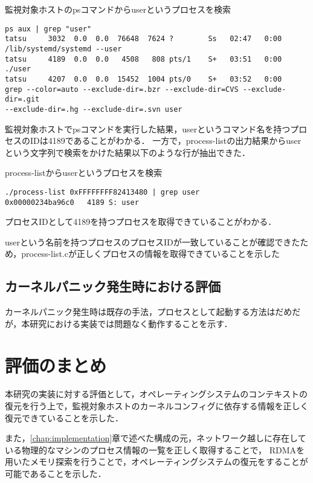 \begin{itembox}[l]{監視対象ホストのpsコマンドからuserというプロセスを検索}
    \begin{verbatim}
ps aux | grep "user"
tatsu     3032  0.0  0.0  76648  7624 ?        Ss   02:47   0:00
/lib/systemd/systemd --user
tatsu     4189  0.0  0.0   4508   808 pts/1    S+   03:51   0:00 ./user
tatsu     4207  0.0  0.0  15452  1004 pts/0    S+   03:52   0:00
grep --color=auto --exclude-dir=.bzr --exclude-dir=CVS --exclude-dir=.git
--exclude-dir=.hg --exclude-dir=.svn user
    \end{verbatim}
\end{itembox}

監視対象ホストでpsコマンドを実行した結果，userというコマンド名を持つプロセスのIDは4189であることがわかる．
一方で，process-listの出力結果からuserという文字列で検索をかけた結果以下のような行が抽出できた．

\begin{itembox}[l]{process-listからuserというプロセスを検索}
    \begin{verbatim}
./process-list 0xFFFFFFFF82413480 | grep user
0x00000234ba96c0   4189 S: user
    \end{verbatim}
\end{itembox}

プロセスIDとして4189を持つプロセスを取得できていることがわかる．

userという名前を持つプロセスのプロセスIDが一致していることが確認できたため，process-list.cが正しくプロセスの情報を取得できていることを示した

\subsection{カーネルパニック発生時における評価}

カーネルパニック発生時は既存の手法，プロセスとして起動する方法はだめだが，本研究における実装では問題なく動作することを示す．

\section{評価のまとめ}

本研究の実装に対する評価として，オペレーティングシステムのコンテキストの復元を行う上で，監視対象ホストのカーネルコンフィグに依存する情報を正しく復元できていることを示した．

また，\ref{chap:implementation}章で述べた構成の元，ネットワーク越しに存在している物理的なマシンのプロセス情報の一覧を正しく取得することで，
RDMAを用いたメモリ探索を行うことで，オペレーティングシステムの復元をすることが可能であることを示した．

